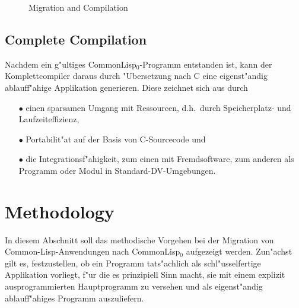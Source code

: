 \begin{figure*}[htb] %
\def\epsfsize#1#2{0.4#1}
\centerline{}
\par
\caption{Migration and Compilation \label{lifecycle}}
\end{figure*}

\subsection{Complete Compilation}

Nachdem ein g"ultiges CommonLisp$_0$-Programm entstanden ist, kann der
Komplettcompiler daraus durch "Ubersetzung nach C eine eigenst"andig
ablauf\/f"ahige Applikation generieren. Diese zeichnet sich aus durch

\begin{itemize}
\item[$\bullet$] einen sparsamen Umgang mit Ressourcen, d.h.\ durch
Speicherplatz- und Laufzeit\-effi\-zienz,
\item[$\bullet$] Portabilit"at auf der Basis von C-Sourcecode und
\item[$\bullet$] die Integrationsf"ahigkeit, zum einen mit
Fremdsoftware, zum anderen als Programm oder Modul in
Standard-DV-Umgebungen.
\end{itemize}

\section{Methodology}
\label{vorgehen}

In diesem Abschnitt soll das methodische Vorgehen bei der Migration
von Common-Lisp-Anwendungen nach CommonLisp$_0$ aufgezeigt werden.
Zun"achst gilt es, festzustellen, ob ein Programm tats"achlich als
schl"usselfertige Applikation vorliegt, f"ur die es prinzipiell Sinn
macht, sie mit einem explizit ausprogrammierten Hauptprogramm zu
versehen und als eigenst"andig ablauf\/f"ahiges Programm auszuliefern.


